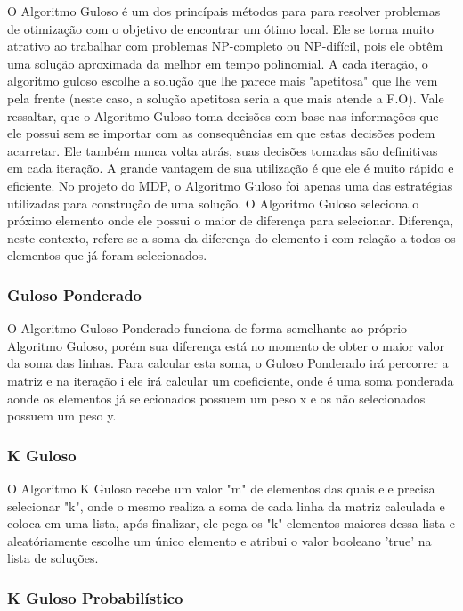 \documentclass[12pt]{article}
\begin{document}
O Algoritmo Guloso é um dos princípais métodos para para resolver problemas de otimização com o objetivo de encontrar um ótimo local. Ele se torna muito atrativo ao trabalhar com problemas NP-completo ou NP-difícil, pois ele obtêm uma solução aproximada da melhor em tempo polinomial. A cada iteração, o algoritmo guloso escolhe a solução que lhe parece mais "apetitosa" que lhe vem pela frente (neste caso, a solução apetitosa seria a que mais atende a F.O). Vale ressaltar, que o Algoritmo Guloso toma decisões com base nas informações que ele possui sem se importar com as consequências em que estas decisões podem acarretar. Ele também nunca volta atrás, suas decisões tomadas são definitivas em cada iteração. A grande vantagem de sua utilização é que ele é muito rápido e eficiente. No projeto do MDP, o Algoritmo Guloso foi apenas uma das estratégias utilizadas para construção de uma solução. O Algoritmo Guloso seleciona o próximo elemento onde ele possui o maior de diferença para selecionar. Diferença, neste contexto, refere-se a soma da diferença do elemento i com relação a todos os elementos que já foram selecionados.

\subsubsection{Guloso Ponderado}

O Algoritmo Guloso Ponderado funciona de forma semelhante ao próprio Algoritmo Guloso, porém sua diferença está no momento de obter o maior valor da soma das linhas. Para calcular esta soma, o Guloso Ponderado irá percorrer a matriz e na iteração i ele irá calcular um coeficiente, onde é uma soma ponderada aonde os elementos já selecionados possuem um peso x e os não selecionados possuem um peso y.  

\subsubsection{K Guloso}

O Algoritmo K Guloso recebe um valor "m" de elementos das quais ele precisa selecionar "k", onde o mesmo realiza a soma de cada linha da matriz calculada e coloca em uma lista, após finalizar, ele pega os "k" elementos maiores dessa lista e aleatóriamente escolhe um único elemento e atribui o valor booleano 'true' na lista de soluções.

\subsubsection{K Guloso Probabilístico}
\end{document}
